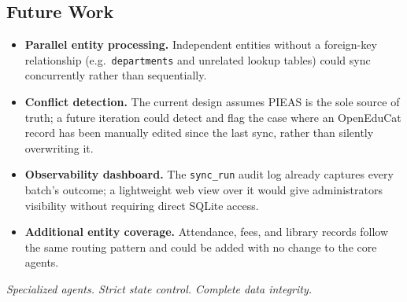 \documentclass[11pt,a4paper]{article}
\begin{document}
\subsection{Future Work}
\begin{itemize}
  \item \textbf{Parallel entity processing.} Independent entities without a foreign-key relationship (e.g.\ \texttt{departments} and unrelated lookup tables) could sync concurrently rather than sequentially.
  \item \textbf{Conflict detection.} The current design assumes PIEAS is the sole source of truth; a future iteration could detect and flag the case where an OpenEduCat record has been manually edited since the last sync, rather than silently overwriting it.
  \item \textbf{Observability dashboard.} The \texttt{sync\_run} audit log already captures every batch's outcome; a lightweight web view over it would give administrators visibility without requiring direct SQLite access.
  \item \textbf{Additional entity coverage.} Attendance, fees, and library records follow the same routing pattern and could be added with no change to the core agents.
\end{itemize}

\vspace{2em}
\begin{center}
{\color{slate}\headingfont\footnotesize\itshape Specialized agents. Strict state control. Complete data integrity.}
\end{center}
\end{document}
